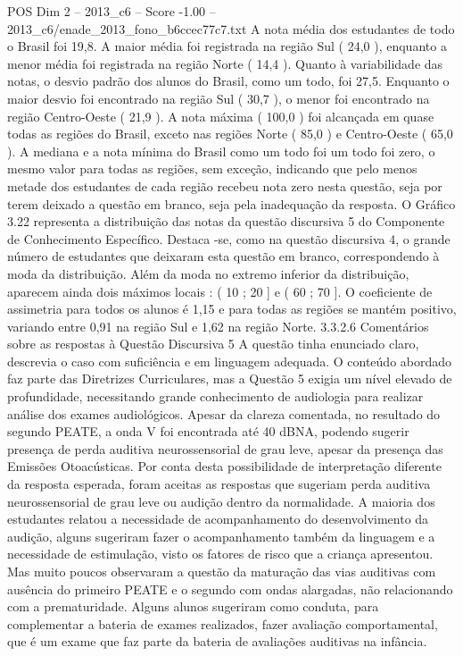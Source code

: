 \begin{textsample}{POS Dim 2 – 2013\_c6 – Score -1.00 – 2013\_c6/enade\_2013\_fono\_b6ccec77c7.txt}
A nota média dos estudantes de todo o Brasil foi 19,8.
A maior média foi registrada na região Sul ( 24,0 ), enquanto a menor média foi registrada na região Norte ( 14,4 ).
Quanto à variabilidade das notas, o desvio padrão dos alunos do Brasil, como um todo, foi 27,5.
Enquanto o maior desvio foi encontrado na região Sul ( 30,7 ), o menor foi encontrado na região Centro-Oeste ( 21,9 ).
A nota máxima ( 100,0 ) foi alcançada em quase todas as regiões do Brasil, exceto nas regiões Norte ( 85,0 ) e Centro-Oeste ( 65,0 ).
A mediana e a nota mínima do Brasil como um todo foi um todo foi zero, o mesmo valor para todas as regiões, sem exceção, indicando que pelo menos metade dos estudantes de cada região recebeu nota zero nesta questão, seja por terem deixado a questão em branco, seja pela inadequação da resposta.
O Gráfico 3.22 representa a distribuição das notas da questão discursiva 5 do Componente de Conhecimento Específico.
Destaca -se, como na questão discursiva 4, o grande número de estudantes que deixaram esta questão em branco, correspondendo à moda da distribuição.
Além da moda no extremo inferior da distribuição, aparecem ainda dois máximos locais : ( 10 ; 20 ] e ( 60 ; 70 ].
O coeficiente de assimetria para todos os alunos é 1,15 e para todas as regiões se mantém positivo, variando entre 0,91 na região Sul e 1,62 na região Norte. 3.3.2.6 Comentários sobre as respostas à Questão Discursiva 5 A questão tinha enunciado claro, descrevia o caso com suficiência e em linguagem adequada.
O conteúdo abordado faz parte das Diretrizes Curriculares, mas a Questão 5 exigia um nível elevado de profundidade, necessitando grande conhecimento de audiologia para realizar análise dos exames audiológicos.
Apesar da clareza comentada, no resultado do segundo PEATE, a onda V foi encontrada até 40 dBNA, podendo sugerir presença de perda auditiva neurossensorial de grau leve, apesar da presença das Emissões Otoacústicas.
Por conta desta possibilidade de interpretação diferente da resposta esperada, foram aceitas as respostas que sugeriam perda auditiva neurossensorial de grau leve ou audição dentro da normalidade.
A maioria dos estudantes relatou a necessidade de acompanhamento do desenvolvimento da audição, alguns sugeriram fazer o acompanhamento também da linguagem e a necessidade de estimulação, visto os fatores de risco que a criança apresentou.
Mas muito poucos observaram a questão da maturação das vias auditivas com ausência do primeiro PEATE e o segundo com ondas alargadas, não relacionando com a prematuridade.
Alguns alunos sugeriram como conduta, para complementar a bateria de exames realizados, fazer avaliação comportamental, que é um exame que faz parte da bateria de avaliações auditivas na infância.

\end{textsample}
